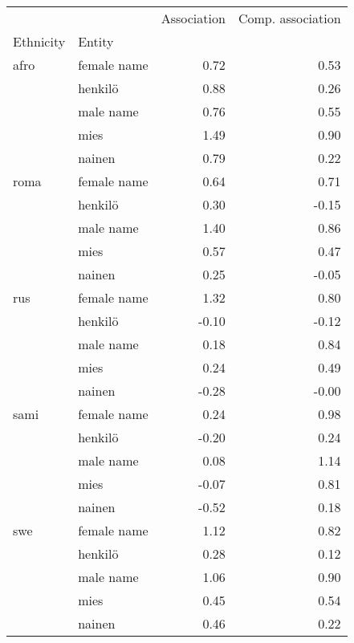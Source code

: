 \begin{tabular}{llrr}
\toprule
    &        &  Association &  Comp. association \\
Ethnicity & Entity &              &                    \\
\midrule
afro & female name &         0.72 &               0.53 \\
    & henkilö &         0.88 &               0.26 \\
    & male name &         0.76 &               0.55 \\
    & mies &         1.49 &               0.90 \\
    & nainen &         0.79 &               0.22 \\
roma & female name &         0.64 &               0.71 \\
    & henkilö &         0.30 &              -0.15 \\
    & male name &         1.40 &               0.86 \\
    & mies &         0.57 &               0.47 \\
    & nainen &         0.25 &              -0.05 \\
rus & female name &         1.32 &               0.80 \\
    & henkilö &        -0.10 &              -0.12 \\
    & male name &         0.18 &               0.84 \\
    & mies &         0.24 &               0.49 \\
    & nainen &        -0.28 &              -0.00 \\
sami & female name &         0.24 &               0.98 \\
    & henkilö &        -0.20 &               0.24 \\
    & male name &         0.08 &               1.14 \\
    & mies &        -0.07 &               0.81 \\
    & nainen &        -0.52 &               0.18 \\
swe & female name &         1.12 &               0.82 \\
    & henkilö &         0.28 &               0.12 \\
    & male name &         1.06 &               0.90 \\
    & mies &         0.45 &               0.54 \\
    & nainen &         0.46 &               0.22 \\
\bottomrule
\end{tabular}
